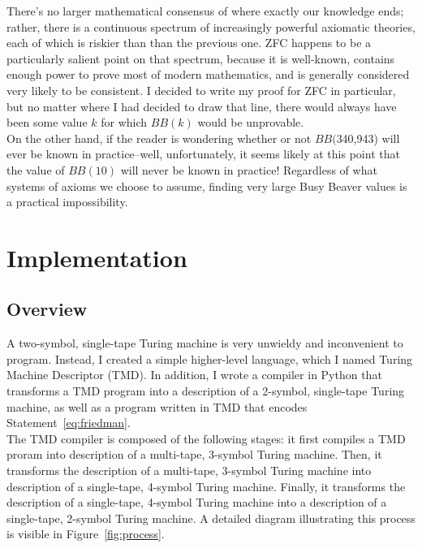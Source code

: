 \documentclass[11pt]{report}
\newcommand{\bbstatenum}{$BB($340,943) }
\begin{document}
There's no larger mathematical consensus of where exactly our knowledge ends; rather, there is a continuous spectrum of increasingly powerful axiomatic theories, each of which is riskier than than the previous one. ZFC happens to be a particularly salient point on that spectrum, because it is well-known, contains enough power to prove most of modern mathematics, and is generally considered very likely to be consistent. I decided to write my proof for ZFC in particular, but no matter where I had decided to draw that line, there would always have been some value $k$ for which $BB(k)$ would be unprovable. \\

On the other hand, if the reader is wondering whether or not \bbstatenum will ever be known in practice--well, unfortunately, it seems likely at this point that the value of $BB(10)$ will never be known in practice! Regardless of what systems of axioms we choose to assume, finding very large Busy Beaver values is a practical impossibility.~\cite{bbimpossible}

\chapter{Implementation \label{sec:implementation}}

\section{Overview}

A two-symbol, single-tape Turing machine is very unwieldy and inconvenient to program. Instead, I created a simple higher-level language, which I named Turing Machine Descriptor (TMD). In addition, I wrote a compiler in Python that transforms a TMD program into a description of a 2-symbol, single-tape Turing machine, as well as a program written in TMD that encodes Statement~\ref{eq:friedman}. \\
 
The TMD compiler is composed of the following stages: it first compiles a TMD proram into description of a multi-tape, 3-symbol Turing machine. Then, it transforms the description of a multi-tape, 3-symbol Turing machine into description of a single-tape, 4-symbol Turing machine. Finally, it transforms the description of a single-tape, 4-symbol Turing machine into a description of a single-tape, 2-symbol Turing machine. A detailed diagram illustrating this process is visible in Figure~\ref{fig:process}. \\
\end{document}
